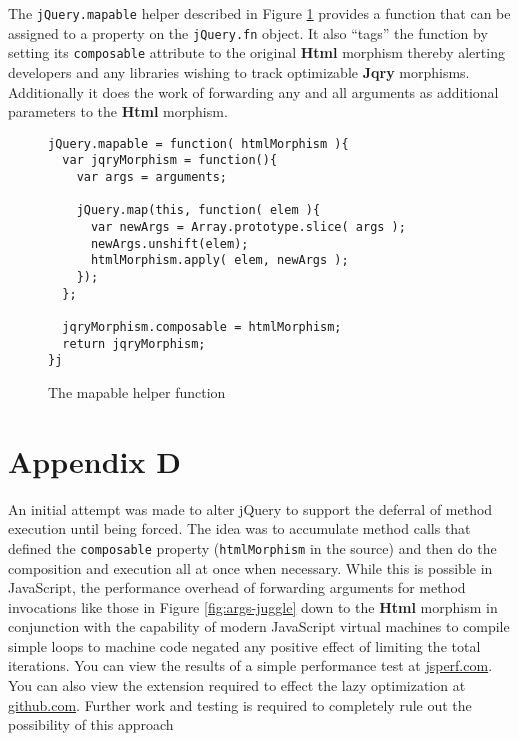 \documentclass[preprint]{sigplanconf}
\begin{document}
The \verb|jQuery.mapable| helper described in Figure \ref{fig:mapable} provides a function that can be assigned to a property on the \verb|jQuery.fn| object. It also ``tags'' the function by setting its \verb|composable| attribute to the original \textbf{Html} morphism thereby alerting developers and any libraries wishing to track optimizable \textbf{Jqry} morphisms. Additionally it does the work of forwarding any and all arguments as additional parameters to the \textbf{Html} morphism.

\begin{figure}[!ht]
\small
\begin{verbatim}
jQuery.mapable = function( htmlMorphism ){
  var jqryMorphism = function(){
    var args = arguments;

    jQuery.map(this, function( elem ){
      var newArgs = Array.prototype.slice( args );
      newArgs.unshift(elem);
      htmlMorphism.apply( elem, newArgs );
    });
  };

  jqryMorphism.composable = htmlMorphism;
  return jqryMorphism;
}j
\end{verbatim}
\nocaptionrule \caption{The mapable helper function}
\label{fig:mapable}
\end{figure}

\section{Appendix D}

An initial attempt was made to alter jQuery to support the deferral of method execution until being forced. The idea was to accumulate method calls that defined the \verb|composable| property (\verb|htmlMorphism| in the source) and then do the composition and execution all at once when necessary. While this is possible in JavaScript, the performance overhead of forwarding arguments for method invocations like those in Figure \ref{fig:args-juggle} down to the \textbf{Html} morphism in conjunction with the capability of modern JavaScript virtual machines to compile simple loops to machine code negated any positive effect of limiting the total iterations. You can view the results of a simple performance test at \href{http://jsperf.com/lazy-loop-fusion-vs-traditional-method-chaning/5}{jsperf.com}. You can also view the extension required to effect the lazy optimization at \href{https://github.com/johnbender/jquery-lazy-proxy/blob/79ab61e22547169d6f392512f782df2e29362ebc/lazy.js}{github.com}. Further work and testing is required to completely rule out the possibility of this approach
\end{document}
